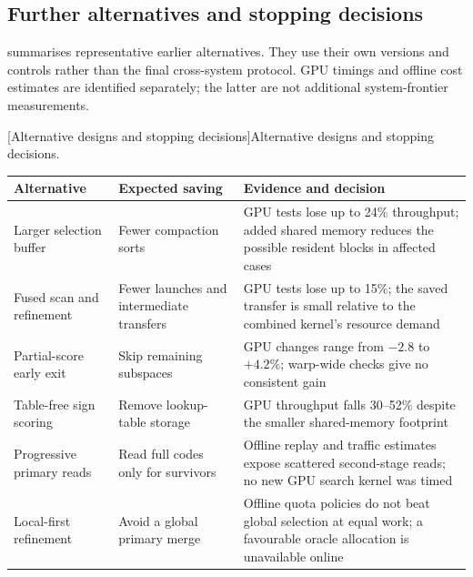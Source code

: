 \subsection{Further alternatives and stopping decisions}
\label{sec:8-stopped}

 summarises representative earlier alternatives.
They use their own versions and controls rather than the final
cross-system protocol. GPU timings and offline cost estimates are
identified separately; the latter are not additional system-frontier
measurements.

\par\medskip\noindent\begin{minipage}{\linewidth}
\centering\captionsetup{hypcap=false}
[Alternative designs and stopping decisions]{Alternative designs and stopping decisions.}
\label{tab:8-stopped}
\footnotesize\setlength{\tabcolsep}{4pt}
\begin{tabularx}{\linewidth}{@{}>{\raggedright\arraybackslash}p{.24\linewidth}>{\raggedright\arraybackslash}p{.24\linewidth}X@{}}
\toprule
Alternative & Expected saving & Evidence and decision \\
\midrule
Larger selection buffer & Fewer compaction sorts & GPU tests lose up to 24\% throughput; added shared memory reduces the possible resident blocks in affected cases \\
Fused scan and refinement & Fewer launches and intermediate transfers & GPU tests lose up to 15\%; the saved transfer is small relative to the combined kernel's resource demand \\
Partial-score early exit & Skip remaining subspaces & GPU changes range from $-2.8$ to $+4.2\%$; warp-wide checks give no consistent gain \\
Table-free sign scoring & Remove lookup-table storage & GPU throughput falls 30--52\% despite the smaller shared-memory footprint \\
Progressive primary reads & Read full codes only for survivors & Offline replay and traffic estimates expose scattered second-stage reads; no new GPU search kernel was timed \\
Local-first refinement & Avoid a global primary merge & Offline quota policies do not beat global selection at equal work; a favourable oracle allocation is unavailable online \\
\bottomrule
\end{tabularx}
\end{minipage}\par\medskip
